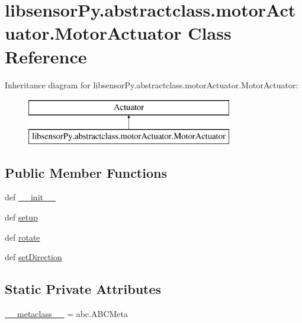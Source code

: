 \hypertarget{classlibsensorPy_1_1abstractclass_1_1motorActuator_1_1MotorActuator}{}\section{libsensor\+Py.\+abstractclass.\+motor\+Actuator.\+Motor\+Actuator Class Reference}
\label{classlibsensorPy_1_1abstractclass_1_1motorActuator_1_1MotorActuator}
Inheritance diagram for libsensor\+Py.\+abstractclass.\+motor\+Actuator.\+Motor\+Actuator\+:\begin{figure}[H]
\begin{center}
\leavevmode
\includegraphics[height=2.000000cm]{classlibsensorPy_1_1abstractclass_1_1motorActuator_1_1MotorActuator}
\end{center}
\end{figure}
\subsection*{Public Member Functions}
\begin{DoxyCompactItemize}
\item 
def \hyperlink{classlibsensorPy_1_1abstractclass_1_1motorActuator_1_1MotorActuator_a6b14fef1f105ec45b95318aebb263823}{\+\_\+\+\_\+init\+\_\+\+\_\+}
\item 
def \hyperlink{classlibsensorPy_1_1abstractclass_1_1motorActuator_1_1MotorActuator_aa2510502afe876b74766435ab6ce6ff6}{setup}
\item 
def \hyperlink{classlibsensorPy_1_1abstractclass_1_1motorActuator_1_1MotorActuator_ade34442ef56141906f0d4d0dc76984e2}{rotate}
\item 
def \hyperlink{classlibsensorPy_1_1abstractclass_1_1motorActuator_1_1MotorActuator_abfec7cc8ea4fc15f2a444aadd57849c3}{set\+Direction}
\end{DoxyCompactItemize}
\subsection*{Static Private Attributes}
\begin{DoxyCompactItemize}
\item 
\hyperlink{classlibsensorPy_1_1abstractclass_1_1motorActuator_1_1MotorActuator_ac4bd7abc5b7e0e580c45f4896d1328f9}{\+\_\+\+\_\+metaclass\+\_\+\+\_\+} = abc.\+A\+B\+C\+Meta
\end{DoxyCompactItemize}


